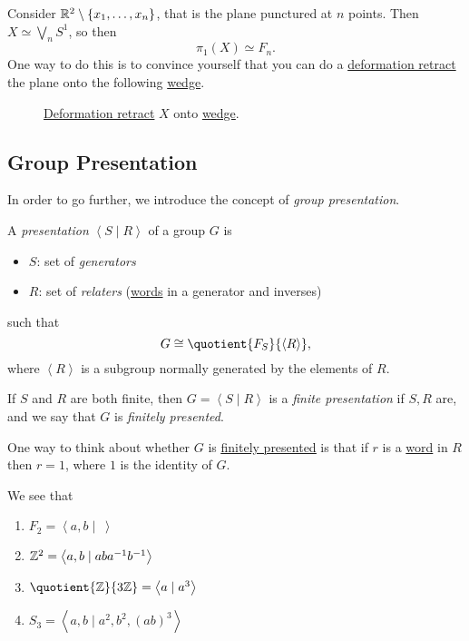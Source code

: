 \begin{exercise}
	Consider \(\mathbb{\MakeUppercase{r}} ^2 \setminus \{x_1, \ldots , x_n \}\), that is the plane punctured at \(n\) points. Then \(X \simeq \bigvee_n S^1\), so then
	\[
		\pi _1(X)\simeq F_n.
	\]
	One way to do this is to convince yourself that you can do a \hyperref[def:deformation-retraction]{deformation retract} the plane onto the following \hyperref[sssec:Wedge-sum]{wedge}.
	\begin{figure}[H]
		\centering
		\caption{\hyperref[def:deformation-retraction]{Deformation retract} \(X\) onto \hyperref[sssec:Wedge-sum]{wedge}.}
		\label{fig:lec11:ex}
	\end{figure}
\end{exercise}

\subsection{Group Presentation}
In order to go further, we introduce the concept of \emph{group presentation}.
\begin{definition}\label{def:group-presentation}
	A \emph{presentation} \(\left< S \mid R \right> \) of a group \(G\) is
	\begin{itemize}
		\item \(S\): set of \emph{generators}
		\item \(R\): set of \emph{relaters} (\hyperref[def:word]{words} in a generator and inverses)
	\end{itemize}
	such that
	\[
		G\cong \quotient{F_S}{\left< R \right>},
	\]
	where \(\left< R \right> \) is a subgroup normally generated by the elements of \(R\).
\end{definition}

\begin{definition}\label{def:finite-presentation}
	If \(S\) and \(R\) are both finite, then \(G = \left< S \mid R \right> \) is a \emph{finite presentation} if \(S, R\) are, and we say that \(G\) is \emph{finitely presented}.
\end{definition}
\begin{note}
	One way to think about whether \(G\) is \hyperref[def:finite-presentation]{\underline{finitely presented}} is that if \(r\) is a
	\hyperref[def:word]{word} in \(R\) then \(r = 1\), where \(1\) is the identity of \(G\).
\end{note}

\begin{eg}
	We see that
	\begin{enumerate}
		\item \(F_2 = \left< a, b \mid\ \right> \)
		\item \(\mathbb{\MakeUppercase{z}} ^2 = \left< a, b \mid aba^{-1} b^{-1}  \right> \)
		\item \(\quotient{\mathbb{\MakeUppercase{z}}}{3\mathbb{\MakeUppercase{z}}} = \left< a \mid a^3 \right> \)
		\item \(S_3 = \left< a, b \mid a^2, b^2, (ab)^3 \right> \)
	\end{enumerate}
\end{eg}

